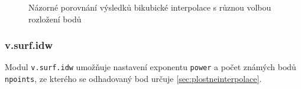\documentclass[a4paper,12pt,oneside]{report}
\begin{document}
\begin{figure}[h!]%
    \centering
    \qquad
           \caption[Bikubická interpolace]{Názorné porovnání výsledků bikubické interpolace s různou volbou rozložení bodů \centering}%

    \label{fig:example}%
\end{figure}







\subsubsection*{v.surf.idw}
Modul \texttt{v.surf.idw} umožňuje nastavení exponentu \texttt{power}
a počet známých bodů \texttt{npoints}, ze kterého se odhadovaný bod
určuje \ref{sec:plostneinterpolace}.
\end{document}
